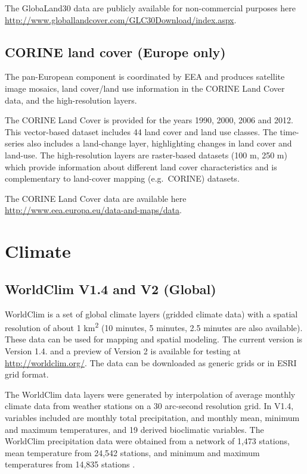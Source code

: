 \documentclass[10pt,b5paper,]{book}
\theoremstyle{definition}
\theoremstyle{definition}
\theoremstyle{definition}
\theoremstyle{remark}
\begin{document}
The GlobaLand30 data are publicly available for non-commercial purposes
here \url{http://www.globallandcover.com/GLC30Download/index.aspx}.

\hypertarget{corine-land-cover-europe-only}{%
\subsection{CORINE land cover (Europe
only)}\label{corine-land-cover-europe-only}}

The pan-European component is coordinated by EEA and produces satellite
image mosaics, land cover/land use information in the CORINE Land Cover
data, and the high-resolution layers.

The CORINE Land Cover is provided for the years 1990, 2000, 2006 and
2012. This vector-based dataset includes 44 land cover and land use
classes. The time-series also includes a land-change layer, highlighting
changes in land cover and land-use. The high-resolution layers are
raster-based datasets (100 m, 250 m) which provide information about
different land cover characteristics and is complementary to land-cover
mapping (e.g.~CORINE) datasets.

The CORINE Land Cover data are available here
\url{http://www.eea.europa.eu/data-and-maps/data}.

\hypertarget{climate}{%
\section{Climate}\label{climate}}

\hypertarget{worldclim-v1.4-and-v2-global}{%
\subsection{WorldClim V1.4 and V2
(Global)}\label{worldclim-v1.4-and-v2-global}}

WorldClim is a set of global climate layers (gridded climate data) with
a spatial resolution of about 1 km\textsuperscript{2} (10 minutes, 5
minutes, 2.5 minutes are also available). These data can be used for
mapping and spatial modeling. The current version is Version 1.4. and a
preview of Version 2 is available for testing at
\url{http://worldclim.org/}. The data can be downloaded as generic grids
or in ESRI grid format.

The WorldClim data layers were generated by interpolation of average
monthly climate data from weather stations on a 30 arc-second resolution
grid. In V1.4, variables included are monthly total precipitation, and
monthly mean, minimum and maximum temperatures, and 19 derived
bioclimatic variables. The WorldClim precipitation data were obtained
from a network of 1,473 stations, mean temperature from 24,542 stations,
and minimum and maximum temperatures from 14,835 stations
\citep{hijmans2005very}.
\end{document}
